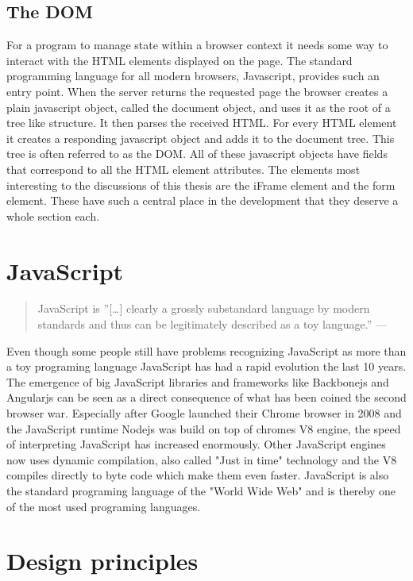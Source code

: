 \documentclass[english]{ifimaster}
\begin{document}
\subsection{The DOM}
For a program to manage state within a browser context it needs some way to interact with the HTML elements displayed on the page. The standard programming language for all modern browsers, Javascript, provides such an entry point. When the server returns the requested page the browser creates a plain javascript object, called the document object, and uses it as the root of a tree like structure. It then parses the received HTML. For every HTML element it creates a responding javascript object and adds it to the document tree. This tree is often referred to as the DOM. All of these javascript objects have fields that correspond to all the HTML element attributes. The elements most interesting to the discussions of this thesis are the iFrame element and the form element. These have such a central place in the development that they deserve a whole section each.


\section{JavaScript}
\begin{quotation}
\noindent JavaScript is ”[…] clearly a grossly substandard language by modern
standards and thus can be legitimately described as a toy language.” —
\parencite{arno}
\end{quotation}

Even though some people still have problems recognizing JavaScript as more than a toy programing language JavaScript has had a rapid evolution the last 10 years. The emergence of  big JavaScript libraries and frameworks like Backbonejs and Angularjs can be seen as a direct consequence of what has been coined the second browser war\parencite{Yule2013}. Especially after Google launched their Chrome browser in 2008 and the JavaScript runtime Nodejs was build on top of chromes V8 engine, the speed of interpreting JavaScript has increased enormously. Other JavaScript engines now uses dynamic compilation, also called "Just in time" technology and the V8 compiles directly to byte code which make them even faster\parencite{anand}. JavaScript is also the standard programing language of the "World Wide Web"\parencite[p. 1]{flanagan} and is thereby one of the most used programing languages.



\section{Design principles}
\end{document}
